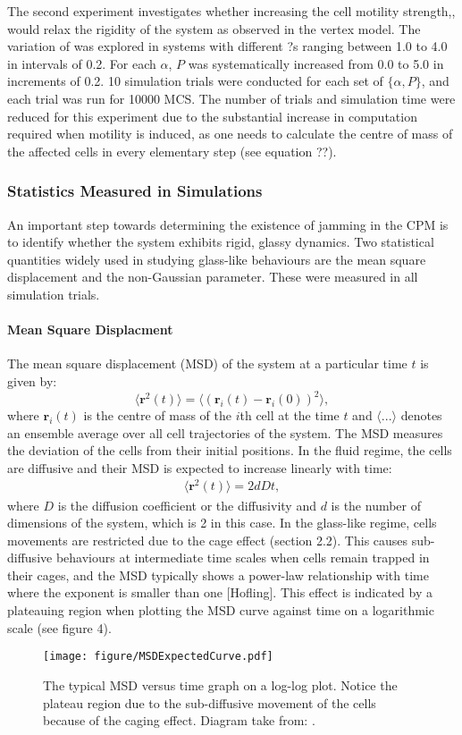\documentclass[a4paper,12pt]{article}
\begin{document}
The second experiment investigates whether increasing the cell motility strength,, would relax the rigidity of the system as observed in the vertex model. The variation of  was explored in systems with different ?s ranging between 1.0 to 4.0 in intervals of 0.2. For each $\alpha$, $P$ was systematically increased from 0.0 to 5.0 in increments of 0.2. 10 simulation trials were conducted for each set of  $\{\alpha,P\}$, and each trial was run for 10000 MCS. The number of trials and simulation time were reduced for this experiment due to the substantial increase in computation required when motility is induced, as one needs to calculate the centre of mass of the affected cells in every elementary step (see equation ??). 

\subsubsection{Statistics Measured in Simulations}
\label{sec:StatsMeasure}
An important step towards determining the existence of jamming in the CPM is to identify whether the system exhibits rigid, glassy dynamics. Two statistical quantities widely used in studying glass-like behaviours are the mean square displacement and the non-Gaussian parameter. These were measured in all simulation trials. 

\paragraph{Mean Square Displacment}
The mean square displacement (MSD) of the system at a particular time $t$ is given by:
\begin{equation}
\langle{\bm{r}^2(t)\rangle} = \langle{\left(\bm{r}_i(t) - \bm{r}_i(0)\right)^2\rangle},
\end{equation}
where $\bm{r}_i (t)$ is the centre of mass of the $i$th cell at the time $t$ and $\langle...\rangle$ denotes an ensemble average over all cell trajectories of the system. The MSD measures the deviation of the cells from their initial positions. In the fluid regime, the cells are diffusive and their MSD is expected to increase linearly with time:\begin{eqnarray}
\langle{\bm{r}^2(t)\rangle} = 2dDt, 
\end{eqnarray}
where $D$ is the diffusion coefficient or the diffusivity and $d$ is the number of dimensions of the system, which is 2 in this case. In the glass-like regime, cells movements are restricted due to the cage effect (section 2.2). This causes sub-diffusive behaviours at intermediate time scales when cells remain trapped in their cages, and the MSD typically shows a power-law relationship with time where the exponent is smaller than one [Hofling]. This effect is indicated by a plateauing region when plotting the MSD curve against time on a logarithmic scale (see figure 4).
\begin{figure}[h]
\centering
\texttt{[image: figure/MSDExpectedCurve.pdf]}
\caption{The typical MSD versus time graph on a log-log plot. Notice the plateau region due to the sub-diffusive movement of the cells because of the caging effect. Diagram take from: \cite{hofling2013}.}
\label{fig:MSDExpectedCurve}
\end{figure}
\end{document}
